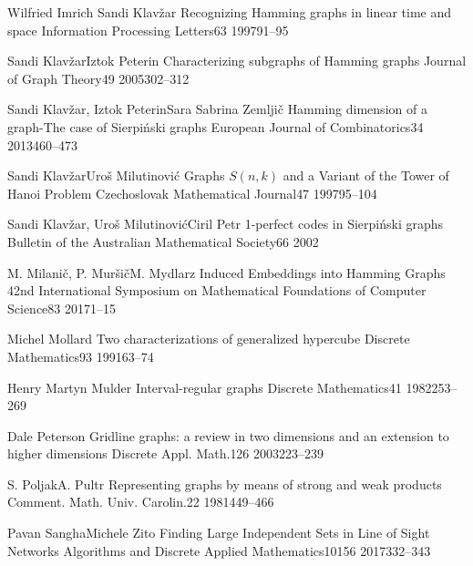 \documentclass[12pt,a4paper,titlepage,openany]{report}
\begin{document}
\begin{thebibliography}{99}
  \articleInJournalManyAuthors
    {Wilfried Imrich} {Sandi Klav\v zar}
    {Recognizing Hamming graphs in linear time and space}
   {Information Processing Letters}{63}
   {1997}{91--95}

  \articleInJournalManyAuthors
    {Sandi Klav\v zar}{Iztok Peterin}
    {Characterizing subgraphs of Hamming graphs}
   {Journal of Graph Theory}{49}
   {2005}{302--312} 

  \articleInJournalManyAuthors
    {Sandi Klav\v zar, Iztok Peterin}{Sara Sabrina Zemlji\v c}
    {Hamming dimension of a graph-The case of Sierpi\'nski graphs}
   {European Journal of Combinatorics}{34}
   {2013}{460--473}

  \articleInJournalManyAuthors
    {Sandi Klav\v zar}{Uro\v s Milutinovi\' c}
    {Graphs $S(n, k)$ and a Variant of the Tower of Hanoi Problem}
   {Czechoslovak Mathematical Journal}{47}
   {1997}{95--104}

  \articleInJournalManyAuthors
    {Sandi Klav\v zar, Uro\v s Milutinovi\' c}{Ciril Petr}
    {1-perfect codes in Sierpi\' nski graphs}
   {Bulletin of the Australian Mathematical Society}{66}
   {2002}{}


  \articleInJournalManyAuthors
    {M. Milani\v c, P. Mur\v si\v c}{M. Mydlarz}
    {Induced Embeddings into Hamming Graphs}
   {42nd International Symposium on Mathematical Foundations of Computer Science}{83}
   {2017}{1--15}   

  \articleInJournalOneAuthor
    {Michel Mollard}
    {Two characterizations of generalized hypercube}
   {Discrete Mathematics}{93}
   {1991}{63--74}

  \articleInJournalOneAuthor
    {Henry Martyn Mulder}
    {Interval-regular graphs}
   {Discrete Mathematics}{41}
   {1982}{253--269}  

\articleInJournalOneAuthor
    {Dale Peterson}
    {Gridline graphs: a review in two dimensions and an extension to higher dimensions}
   {Discrete Appl. Math.}{126}
   {2003}{223--239}


  \articleInJournalManyAuthors
    {S. Poljak}{A. Pultr}
    {Representing graphs by means of strong and weak products}
   {Comment. Math. Univ. Carolin.}{22}
   {1981}{449--466} 


  \articleInJournalManyAuthors
    {Pavan Sangha}{Michele Zito}
    {Finding Large Independent Sets in Line of Sight Networks}
   {Algorithms and Discrete Applied Mathematics}{10156}
   {2017}{332--343}    


\end{thebibliography}
\end{document}
